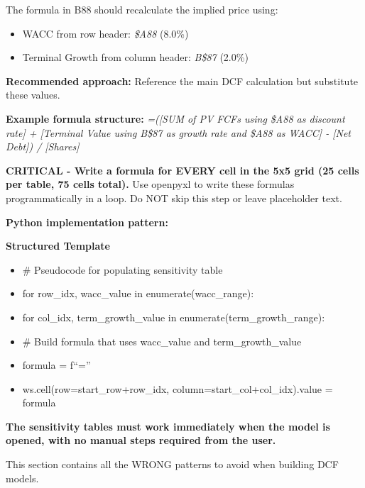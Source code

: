 \documentclass[11pt]{article}
\begin{document}
The formula in B88 should recalculate the implied price using:

\begin{itemize}[leftmargin=*,itemsep=2pt,topsep=2pt]
\item {} WACC from row header: \emph{\$A88} (8.0\%)
\item {} Terminal Growth from column header: \emph{B\$87} (2.0\%)
\end{itemize}

\textbf{Recommended approach:} Reference the main DCF calculation but substitute these values.


\textbf{Example formula structure:} \emph{=([SUM of PV FCFs using \$A88 as discount rate] + [Terminal Value using B\$87 as growth rate and \$A88 as WACC] - [Net Debt]) / [Shares]}


\textbf{CRITICAL - Write a formula for EVERY cell in the 5x5 grid (25 cells per table, 75 cells total).} Use openpyxl to write these formulas programmatically in a loop. Do NOT skip this step or leave placeholder text.


\textbf{Python implementation pattern:}

\textbf{Structured Template}
\begin{itemize}[leftmargin=*,itemsep=2pt,topsep=2pt]
\item {} \# Pseudocode for populating sensitivity table
\item {} for row\_\allowbreak{}idx, wacc\_\allowbreak{}value in enumerate(wacc\_\allowbreak{}range):
\item {} for col\_\allowbreak{}idx, term\_\allowbreak{}growth\_\allowbreak{}value in enumerate(term\_\allowbreak{}growth\_\allowbreak{}range):
\item {} \# Build formula that uses wacc\_\allowbreak{}value and term\_\allowbreak{}growth\_\allowbreak{}value
\item {} formula = f``=''
\item {} ws.cell(row=start\_\allowbreak{}row+row\_\allowbreak{}idx, column=start\_\allowbreak{}col+col\_\allowbreak{}idx).value = formula
\end{itemize}

\textbf{The sensitivity tables must work immediately when the model is opened, with no manual steps required from the user.}








This section contains all the WRONG patterns to avoid when building DCF models.
\end{document}
